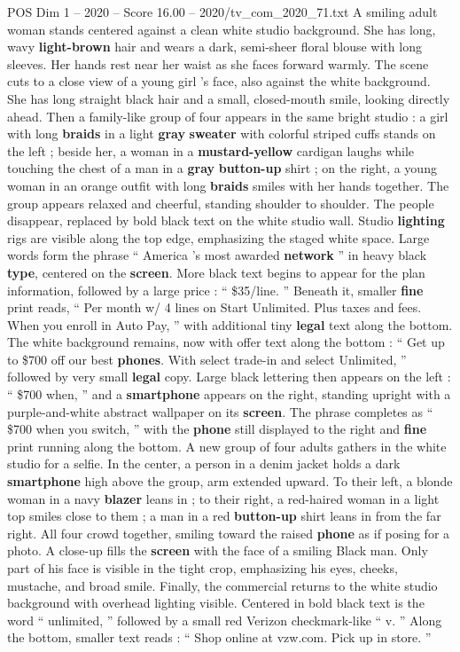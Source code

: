 \begin{textsample}{POS Dim 1 – 2020 – Score 16.00 – 2020/tv\_com\_2020\_71.txt}  \label{ex:f1_pos_009}
A smiling adult woman stands centered against a clean white studio background.
She has long, wavy \textbf{light-brown} hair and wears a dark, semi-sheer floral blouse with long sleeves.
Her hands rest near her waist as she faces forward warmly.
The scene cuts to a close view of a young girl ’s face, also against the white background.
She has long straight black hair and a small, closed-mouth smile, looking directly ahead.
Then a family-like group of four appears in the same bright studio : a girl with long \textbf{braids} in a light \textbf{gray} \textbf{sweater} with colorful striped cuffs stands on the left ; beside her, a woman in a \textbf{mustard-yellow} cardigan laughs while touching the chest of a man in a \textbf{gray} \textbf{button-up} shirt ; on the right, a young woman in an orange outfit with long \textbf{braids} smiles with her hands together.
The group appears relaxed and cheerful, standing shoulder to shoulder.
The people disappear, replaced by bold black text on the white studio wall.
Studio \textbf{lighting} rigs are visible along the top edge, emphasizing the staged white space.
Large words form the phrase “ America ’s most awarded \textbf{network} ” in heavy black \textbf{type}, centered on the \textbf{screen}.
More black text begins to appear for the plan information, followed by a large price : “ \$35/line. ” Beneath it, smaller \textbf{fine} print reads, “ Per month w/ 4 lines on Start Unlimited.
Plus taxes and fees.
When you enroll in Auto Pay, ” with additional tiny \textbf{legal} text along the bottom.
The white background remains, now with offer text along the bottom : “ Get up to \$700 off our best \textbf{phones}.
With select trade-in and select Unlimited, ” followed by very small \textbf{legal} copy.
Large black lettering then appears on the left : “ \$700 when, ” and a \textbf{smartphone} appears on the right, standing upright with a purple-and-white abstract wallpaper on its \textbf{screen}.
The phrase completes as “ \$700 when you switch, ” with the \textbf{phone} still displayed to the right and \textbf{fine} print running along the bottom.
A new group of four adults gathers in the white studio for a selfie.
In the center, a person in a denim jacket holds a dark \textbf{smartphone} high above the group, arm extended upward.
To their left, a blonde woman in a navy \textbf{blazer} leans in ; to their right, a red-haired woman in a light top smiles close to them ; a man in a red \textbf{button-up} shirt leans in from the far right.
All four crowd together, smiling toward the raised \textbf{phone} as if posing for a photo.
A close-up fills the \textbf{screen} with the face of a smiling Black man.
Only part of his face is visible in the tight crop, emphasizing his eyes, cheeks, mustache, and broad smile.
Finally, the commercial returns to the white studio background with overhead lighting visible.
Centered in bold black text is the word “ unlimited, ” followed by a small red Verizon checkmark-like “ v. ” Along the bottom, smaller text reads : “ Shop online at vzw.com.
Pick up in store. ”

\end{textsample}
